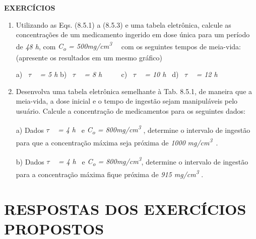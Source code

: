 \noindent\textbf{EXERCÍCIOS \thesubsection}
\begin{enumerate}[label=\thesubsection.\arabic*]
    \item Utilizando as Eqs. (8.5.1) a (8.5.3) e uma tabela eletrônica, calcule as concentrações de um medicamento ingerido em dose única para um período de \textit{48 h}, com \textit{C\textsubscript{o} = 500mg/cm\textsuperscript{3}}~~ com os seguintes tempos de meia-vida: (apresente os resultados em um mesmo gráfico)

    a)~ \textit{$ \tau$ ~ = 5 h} \quad \quad b)~ \textit{$ \tau$ ~ = 8 h~ \quad ~~~ }c)~ \textit{$ \tau$ ~ = 10 h~ \quad }d)~ \textit{$ \tau$ ~ = 12 h~ }

    \item Desenvolva uma tabela eletrônica semelhante à Tab. 8.5.1, de maneira que a meia-vida, a dose inicial e o tempo de ingestão sejam manipuláveis pelo usuário. Calcule a concentração de medicamentos para os seguintes dados:

    a) Dados \textit{$ \tau$ ~ = 4 h~ }e \textit{C\textsubscript{o} = 800mg/cm\textsuperscript{3 }}, determine o intervalo de ingestão para que a concentração máxima seja próxima de \textit{1000} \textit{mg/cm\textsuperscript{3}}~.~~~  

    b) Dados \textit{$ \tau$ ~ = 4 h~ }e \textit{C\textsubscript{o} = 800mg/cm\textsuperscript{3}}, determine o intervalo de ingestão para a concentração máxima fique próxima de \textit{915 mg/cm\textsuperscript{3}} .
\end{enumerate}

\section{RESPOSTAS DOS EXERCÍCIOS PROPOSTOS}

